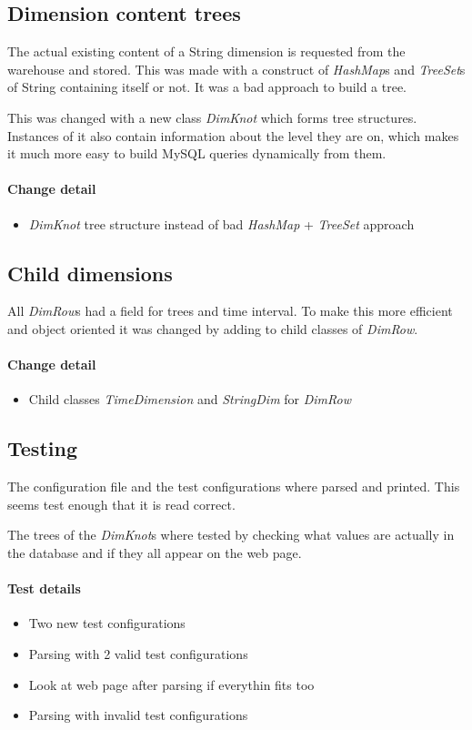 \subsection{Dimension content trees}
The actual existing content of a String dimension is requested from
the warehouse and stored. This was made with a construct
of \textit{HashMap}s and \textit{TreeSet}s of String containing itself or not. It was
a bad approach to build a tree.

This was changed with a new class \textit{DimKnot} which forms tree structures. 
Instances of it also contain information about the level they are on,
which makes it much more easy to build MySQL queries dynamically from them.
\paragraph{Change detail}
\begin{itemize}
  \item \textit{DimKnot} tree structure instead of bad \textit{HashMap} + \textit{TreeSet} approach
\end{itemize}



\subsection{Child dimensions}
All \textit{DimRow}s had a field for trees and time interval. To make this more
efficient and object oriented it was changed
by adding to child classes of \textit{DimRow}.
\paragraph{Change detail}
\begin{itemize}
  \item Child classes \textit{TimeDimension} and \textit{StringDim} for \textit{DimRow}
\end{itemize}

\subsection{Testing}

The configuration file and the test configurations where parsed and printed. 
This seems test enough that it is read correct. 

The trees of the \textit{DimKnot}s where tested by checking what values are actually in the
database and if they all appear on the web page.

\paragraph{Test details}
\begin{itemize}
  \item Two new test configurations
  \item Parsing with 2 valid test configurations
  \item Look at web page after parsing if everythin fits too
  \item Parsing with invalid test configurations
\end{itemize}


